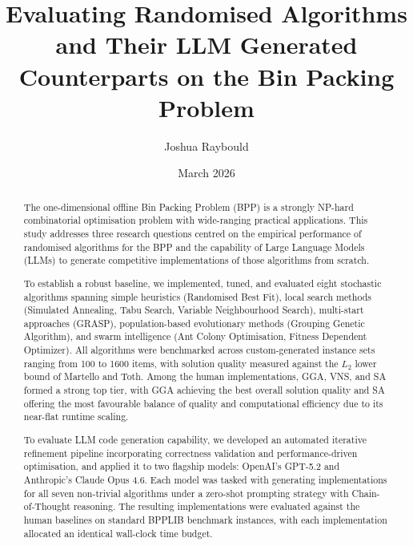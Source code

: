 \documentclass[11pt]{article}
\title{Evaluating Randomised Algorithms and Their LLM Generated Counterparts on the Bin Packing Problem}
\author{Joshua Raybould}
\date{March 2026}
\begin{document}
\maketitle

\begin{abstract}
\setlength{\parindent}{0pt}
\setlength{\parskip}{0.6em}
\noindent The one-dimensional offline Bin Packing Problem (BPP) is a strongly NP-hard combinatorial optimisation problem with wide-ranging practical applications. This study addresses three research questions centred on the empirical performance of randomised algorithms for the BPP and the capability of Large Language Models (LLMs) to generate competitive implementations of those algorithms from scratch.

To establish a robust baseline, we implemented, tuned, and evaluated eight stochastic algorithms spanning simple heuristics (Randomised Best Fit), local search methods (Simulated Annealing, Tabu Search, Variable Neighbourhood Search), multi-start approaches (GRASP), population-based evolutionary methods (Grouping Genetic Algorithm), and swarm intelligence (Ant Colony Optimisation, Fitness Dependent Optimizer). All algorithms were benchmarked across custom-generated instance sets ranging from 100 to 1600 items, with solution quality measured against the $L_2$ lower bound of Martello and Toth. Among the human implementations, GGA, VNS, and SA formed a strong top tier, with GGA achieving the best overall solution quality and SA offering the most favourable balance of quality and computational efficiency due to its near-flat runtime scaling.

To evaluate LLM code generation capability, we developed an automated iterative refinement pipeline incorporating correctness validation and performance-driven optimisation, and applied it to two flagship models: OpenAI's GPT-5.2 and Anthropic's Claude Opus 4.6. Each model was tasked with generating implementations for all seven non-trivial algorithms under a zero-shot prompting strategy with Chain-of-Thought reasoning. The resulting implementations were evaluated against the human baselines on standard BPPLIB benchmark instances, with each implementation allocated an identical wall-clock time budget.


\end{abstract}
\end{document}

